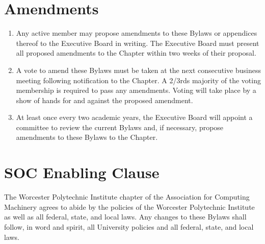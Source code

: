 \documentclass[12pt, letterpaper, oneside]{book}
\begin{document}
\chapter{Amendments}
\begin{enumerate}
    \item Any active member may propose amendments to these Bylaws or appendices
        thereof to the Executive Board in writing. The Executive Board must
        present all proposed amendments to the Chapter within two weeks of their
        proposal.
    \item A vote to amend these Bylaws must be taken at the next consecutive
        business meeting following notification to the Chapter.
        \subitem A 2/3rds majority of the voting membership is required to pass
        any amendments. Voting will take place by a show of hands for and
        against the proposed amendment.
    \item At least once every two academic years, the Executive Board will
        appoint a committee to review the current Bylaws and, if necessary,
        propose amendments to these Bylaws to the Chapter.
\end{enumerate}

\chapter{SOC Enabling Clause}
The Worcester Polytechnic Institute chapter of the Association for Computing
Machinery agrees to abide by the policies of the Worcester Polytechnic Institute
as well as all federal, state, and local laws. Any changes to these Bylaws shall
follow, in word and spirit, all University policies and all federal, state, and
local laws.
\end{document}
